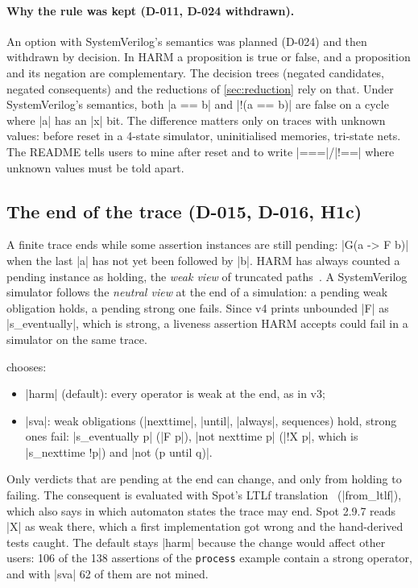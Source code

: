 \paragraph{Why the rule was kept (D-011, D-024 withdrawn).} An option with SystemVerilog's semantics was planned (D-024) and then withdrawn by decision. In HARM a proposition is true or false, and a proposition and its negation are complementary. The decision trees (negated candidates, negated consequents) and the reductions of \cref{sec:reduction} rely on that. Under SystemVerilog's semantics, both \code|a == b| and \code|!(a == b)| are false on a cycle where \code|a| has an \code|x| bit. The difference matters only on traces with unknown values: before reset in a 4-state simulator, uninitialised memories, tri-state nets. The README tells users to mine after reset and to write \code|===|/\code|!==| where unknown values must be told apart.

\subsection{The end of the trace (D-015, D-016, H1c)}\label{sec:traceend}
A finite trace ends while some assertion instances are still pending: \code|G(a -> F b)| when the last \code|a| has not yet been followed by \code|b|. HARM has always counted a pending instance as holding, the \emph{weak view} of truncated paths~\cite{truncated-paths}. A SystemVerilog simulator follows the \emph{neutral view} at the end of a simulation: a pending weak obligation holds, a pending strong one fails. Since v4 prints unbounded \code|F| as \code|s_eventually|, which is strong, a liveness assertion HARM accepts could fail in a simulator on the same trace.

 chooses:
\begin{itemize}
\item \code|harm| (default): every operator is weak at the end, as in v3;
\item \code|sva|: weak obligations (\code|nexttime|, \code|until|, \code|always|, sequences) hold, strong ones fail: \code|s_eventually p| (\code|F p|), \code|not nexttime p| (\code|!X p|, which is \code|s_nexttime !p|) and \code|not (p until q)|.
\end{itemize}
Only verdicts that are pending at the end can change, and only from holding to failing. The consequent is evaluated with Spot's LTLf translation~\cite{ltlf} (\code|from_ltlf|), which also says in which automaton states the trace may end. Spot 2.9.7 reads \code|X| as weak there, which a first implementation got wrong and the hand-derived tests caught. The default stays \code|harm| because the change would affect other users: 106 of the 138 assertions of the \texttt{process} example contain a strong operator, and with \code|sva| 62 of them are not mined.

